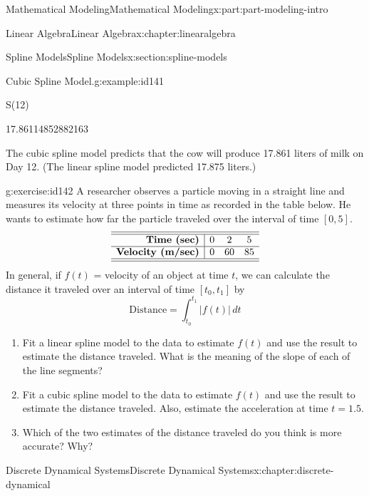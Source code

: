 \documentclass[oneside,10pt,]{book}
\numberwithin{equation}{section}
\newcommand{\amp}{&}
\begin{document}
\begin{partptx}{Mathematical Modeling}{}{Mathematical Modeling}{}{}{x:part:part-modeling-intro}
\begin{chapterptx}{Linear Algebra}{}{Linear Algebra}{}{}{x:chapter:linearalgebra}
\begin{sectionptx}{Spline Models}{}{Spline Models}{}{}{x:section:spline-models}
\begin{example}{Cubic Spline Model.}{g:example:id141}
\begin{sageinput}
S(12)
\end{sageinput}
\begin{sageoutput}
17.86114852882163
\end{sageoutput}
The cubic spline model predicts that the cow will produce 17.861 liters of milk on Day 12. (The linear spline model predicted 17.875 liters.)%
\end{example}
\begin{inlineexercise}{}{g:exercise:id142}%
A researcher observes a particle moving in a straight line and measures its velocity at three points in time as recorded in the table below. He wants to estimate how far the particle traveled over the interval of time \([0, 5]\).%
%
\begin{equation*}
\begin{array}{r|ccc}\hline\hline
\textbf{Time (sec)} \amp 0 \amp 2 \amp 5 \\\hline
\textbf{Velocity (m/sec)} \amp 0 \amp 60 \amp 85 \\\hline\hline
\end{array}
\end{equation*}
In general, if \(f(t)\) = velocity of an object at time \(t\), we can calculate the distance it traveled over an interval of time \([t_0, t_1]\) by%
%
\begin{equation*}
\textrm{Distance} = \int_{t_0}^{t_1} |f(t)|\,dt 
\end{equation*}
\begin{enumerate}[font=\bfseries,label=(\alph*),ref=\alph*]
\item{}Fit a linear spline model to the data to estimate \(f(t)\) and use the result to estimate the distance traveled. What is the meaning of the slope of each of the line segments?%
\item{}Fit a cubic spline model to the data to estimate \(f(t)\) and use the result to estimate the distance traveled. Also, estimate the acceleration at time \(t=1.5\).%
\item{}Which of the two estimates of the distance traveled do you think is more accurate? Why?%
\end{enumerate}
\end{inlineexercise}%
\end{sectionptx}
\end{chapterptx}
%
\typeout{************************************************}
\typeout{************************************************}
%
\begin{chapterptx}{Discrete Dynamical Systems}{}{Discrete Dynamical Systems}{}{}{x:chapter:discrete-dynamical}

\end{chapterptx}
\end{partptx}
\end{document}

